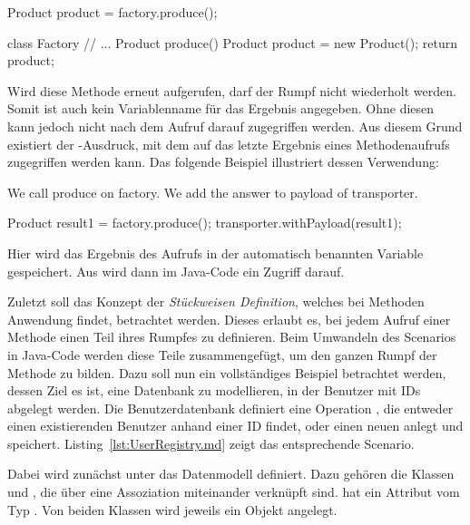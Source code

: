 \begin{jcodeblock}
    Product product = factory.produce();

    class Factory {
        // ...
        Product produce() {
            Product product = new Product();
            return product;
        }
    }
\end{jcodeblock}

Wird diese Methode erneut aufgerufen, darf der Rumpf nicht wiederholt werden.
Somit ist auch kein Variablenname für das Ergebnis angegeben.
Ohne diesen kann jedoch nicht nach dem Aufruf darauf zugegriffen werden.
Aus diesem Grund existiert der -Ausdruck, mit dem auf das letzte Ergebnis eines Methodenaufrufs zugegriffen werden kann.
Das folgende Beispiel illustriert dessen Verwendung:

\begin{codeblock}
    We call produce on factory.
    We add the answer to payload of transporter.
\end{codeblock}

\begin{jcodeblock}
    Product result1 = factory.produce();
    transporter.withPayload(result1);
\end{jcodeblock}

Hier wird das Ergebnis des Aufrufs in der automatisch benannten Variable  gespeichert.
Aus  wird dann im Java-Code ein Zugriff darauf.

Zuletzt soll das Konzept der \emph{Stückweisen Definition}, welches bei Methoden Anwendung findet, betrachtet werden.
Dieses erlaubt es, bei jedem Aufruf einer Methode einen Teil ihres Rumpfes zu definieren.
Beim Umwandeln des Scenarios in Java-Code werden diese Teile zusammengefügt, um den ganzen Rumpf der Methode zu bilden.
Dazu soll nun ein vollständiges Beispiel betrachtet werden, dessen Ziel es ist, eine Datenbank zu modellieren, in der Benutzer mit IDs abgelegt werden.
Die Benutzerdatenbank definiert eine Operation , die entweder einen existierenden Benutzer anhand einer ID findet, oder einen neuen anlegt und speichert.
Listing~\ref{lst:UserRegistry.md} zeigt das entsprechende Scenario.


Dabei wird zunächst unter  das Datenmodell definiert.
Dazu gehören die Klassen  und ,
die über eine Assoziation miteinander verknüpft sind.
 hat ein Attribut  vom Typ .
Von beiden Klassen wird jeweils ein Objekt angelegt.

